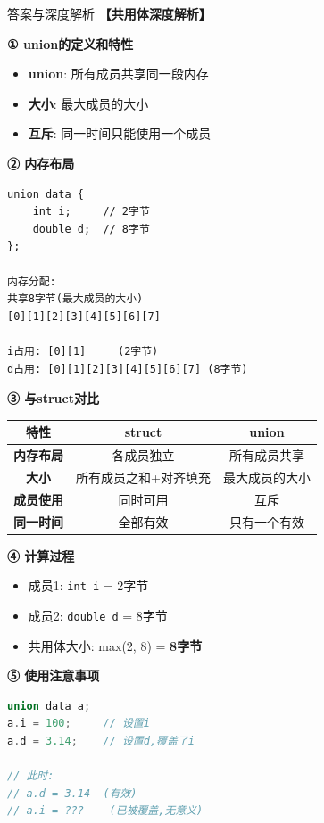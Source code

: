 \documentclass[a4paper,12pt]{article}
\begin{document}
\begin{enumerate}
\begin{bluebox}{答案与深度解析}
	\textbf{【共用体深度解析】}

	\textbf{① union的定义和特性}
	\begin{itemize}[leftmargin=*, nosep]
		\item \textbf{union}: 所有成员共享同一段内存
		\item \textbf{大小}: 最大成员的大小
		\item \textbf{互斥}: 同一时间只能使用一个成员
	\end{itemize}

	\textbf{② 内存布局}
	\begin{verbatim}
union data {
    int i;     // 2字节
    double d;  // 8字节
};

内存分配:
共享8字节(最大成员的大小)
[0][1][2][3][4][5][6][7]

i占用: [0][1]     (2字节)
d占用: [0][1][2][3][4][5][6][7] (8字节)
    \end{verbatim}

	\textbf{③ 与struct对比}
	\begin{tabular}{|c|c|c|}
		\hline
		\textbf{特性}   & \textbf{struct} & \textbf{union} \\
		\hline
		\textbf{内存布局} & 各成员独立           & 所有成员共享         \\
		\hline
		\textbf{大小}   & 所有成员之和+对齐填充     & 最大成员的大小        \\
		\hline
		\textbf{成员使用} & 同时可用            & 互斥             \\
		\hline
		\textbf{同一时间} & 全部有效            & 只有一个有效         \\
		\hline
	\end{tabular}

	\textbf{④ 计算过程}
	\begin{itemize}[leftmargin=*, nosep]
		\item 成员1: \texttt{int i} = 2字节
		\item 成员2: \texttt{double d} = 8字节
		\item 共用体大小: max(2, 8) = \textbf{8字节}
	\end{itemize}

	\textbf{⑤ 使用注意事项}
	\begin{lstlisting}[language=C]
union data a;
a.i = 100;     // 设置i
a.d = 3.14;    // 设置d,覆盖了i

// 此时:
// a.d = 3.14  (有效)
// a.i = ???    (已被覆盖,无意义)
    \end{lstlisting}


\end{bluebox}
\end{enumerate}
\end{document}
